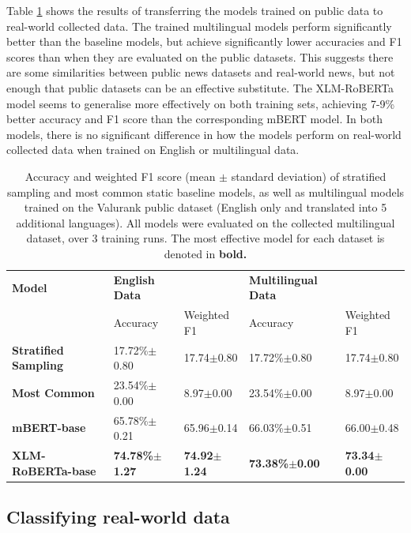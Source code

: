 \documentclass{l4proj}
\begin{document}
Table \ref{table:transferability} shows the results of transferring the models trained on public data to real-world collected data. The trained multilingual models perform significantly better than the baseline models, but achieve significantly lower accuracies and F1 scores than when they are evaluated on the public datasets. This suggests there are some similarities between public news datasets and real-world news, but not enough that public datasets can be an effective substitute. The XLM-RoBERTa model seems to generalise more effectively on both training sets, achieving 7-9\% better accuracy and F1 score than the corresponding mBERT model. In both models, there is no significant difference in how the models perform on real-world collected data when trained on English or multilingual data.

\begin{table}[]
\begin{tabular}{lllll}
\hline
\textbf{Model}               & \textbf{English Data} &             & \textbf{Multilingual Data} &             \\ \cline{2-5} 
                             & Accuracy              & Weighted F1 & Accuracy                   & Weighted F1 \\ \hline
\textbf{Stratified Sampling} & 17.72\%$\pm$0.80     & 17.74$\pm$0.80 & 17.72\%$\pm$0.80     & 17.74$\pm$0.80            \\
\textbf{Most Common}         & 23.54\%$\pm$0.00     & 8.97$\pm$0.00 & 23.54\%$\pm$0.00     & 8.97$\pm$0.00 \\ \hline
\textbf{mBERT-base}          & 65.78\%$\pm$0.21     & 65.96$\pm$0.14         & 66.03\%$\pm$0.51        & 66.00$\pm$0.48         \\
\textbf{XLM-RoBERTa-base}    & \textbf{74.78\%$\pm$1.27}  & \textbf{74.92$\pm$1.24}        & \textbf{73.38\%$\pm$0.00}   & \textbf{73.34$\pm$0.00}        \\ \hline
\end{tabular}
\caption{Accuracy and weighted F1 score (mean $\pm$ standard deviation) of stratified sampling and most common static baseline models, as well as multilingual models trained on the Valurank public dataset (English only and translated into 5 additional languages). All models were evaluated on the collected multilingual dataset, over 3 training runs. The most effective model for each dataset is denoted in \textbf{bold.}}
\label{table:transferability}
\end{table}

\subsection{Classifying real-world data}
\end{document}
